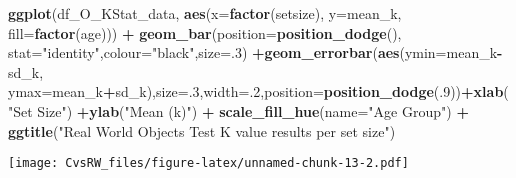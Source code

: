 \documentclass[
]{article}
\newenvironment{Shaded}{\begin{snugshade}}{\end{snugshade}}
\newcommand{\DataTypeTok}[1]{\textcolor[rgb]{0.13,0.29,0.53}{#1}}
\newcommand{\DecValTok}[1]{\textcolor[rgb]{0.00,0.00,0.81}{#1}}
\newcommand{\KeywordTok}[1]{\textcolor[rgb]{0.13,0.29,0.53}{\textbf{#1}}}
\newcommand{\NormalTok}[1]{#1}
\newcommand{\OperatorTok}[1]{\textcolor[rgb]{0.81,0.36,0.00}{\textbf{#1}}}
\newcommand{\StringTok}[1]{\textcolor[rgb]{0.31,0.60,0.02}{#1}}
\begin{document}
\begin{Shaded}
\begin{Highlighting}[]
\KeywordTok{ggplot}\NormalTok{(df_O_KStat_data, }\KeywordTok{aes}\NormalTok{(}\DataTypeTok{x=}\KeywordTok{factor}\NormalTok{(setsize), }\DataTypeTok{y=}\NormalTok{mean_k, }\DataTypeTok{fill=}\KeywordTok{factor}\NormalTok{(age))) }\OperatorTok{+}\StringTok{ }\KeywordTok{geom_bar}\NormalTok{(}\DataTypeTok{position=}\KeywordTok{position_dodge}\NormalTok{(), }\DataTypeTok{stat=}\StringTok{"identity"}\NormalTok{,}\DataTypeTok{colour=}\StringTok{"black"}\NormalTok{,}\DataTypeTok{size=}\NormalTok{.}\DecValTok{3}\NormalTok{) }\OperatorTok{+}\KeywordTok{geom_errorbar}\NormalTok{(}\KeywordTok{aes}\NormalTok{(}\DataTypeTok{ymin=}\NormalTok{mean_k}\OperatorTok{-}\NormalTok{sd_k, }\DataTypeTok{ymax=}\NormalTok{mean_k}\OperatorTok{+}\NormalTok{sd_k),}\DataTypeTok{size=}\NormalTok{.}\DecValTok{3}\NormalTok{,}\DataTypeTok{width=}\NormalTok{.}\DecValTok{2}\NormalTok{,}\DataTypeTok{position=}\KeywordTok{position_dodge}\NormalTok{(.}\DecValTok{9}\NormalTok{))}\OperatorTok{+}\KeywordTok{xlab}\NormalTok{(}\StringTok{"Set Size"}\NormalTok{) }\OperatorTok{+}\KeywordTok{ylab}\NormalTok{(}\StringTok{"Mean (k)"}\NormalTok{) }\OperatorTok{+}\StringTok{ }\KeywordTok{scale_fill_hue}\NormalTok{(}\DataTypeTok{name=}\StringTok{"Age Group"}\NormalTok{) }\OperatorTok{+}\StringTok{ }\KeywordTok{ggtitle}\NormalTok{(}\StringTok{"Real World Objects Test K value results per set size"}\NormalTok{)}
\end{Highlighting}
\end{Shaded}

\texttt{[image: CvsRW\_files/figure-latex/unnamed-chunk-13-2.pdf]}
\end{document}
